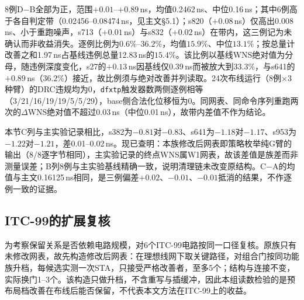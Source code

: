 \documentclass[twocolumn,10pt,fontset=windows]{ctexart}
\begin{document}
8例D$-$B全部为正，范围$+0.01$--$+0.89$\,ns，均值0.2462\,ns、中位0.16\,ns；其中6例高于各自判定带（0.02456--0.08474\,ns，见主文\S5.1）；s820（$+0.08$\,ns）仅高出0.008\,ns、小于重跑噪声，s713（$+0.01$\,ns）与s832（$+0.02$\,ns）在带内，这三例记为未确认而非收益消失。逐例比例为$0.6\%$--$36.2\%$，均值$15.9\%$、中位$13.1\%$；按总量计改善之和1.97\,ns占基线违例总量12.83\,ns的$15.4\%$。该比例以基线WNS绝对值为分母，随违例深度变化，s27的$+0.13$\,ns因基线仅0.39\,ns而被放大到$33.3\%$，与s641的$+0.89$\,ns（$36.2\%$）接近，故比例须与绝对改善并列读取。24次布线运行（8例$\times$3种臂）的DRC违规均为0，\texttt{dfxtp}触发器数两侧逐例相等（3/21/16/19/19/5/5/29），base侧合法化位移恒为0。同网表、同命令序列重跑两次的$\Delta$WNS绝对值不超过0.03\,ns（中位0.01\,ns），故带内差值不作为结论。

本节C列与主实验记录相比，s382为$-0.81$对$-0.83$、s641为$-1.18$对$-1.17$、s953为$-1.22$对$-1.21$，差0.01--0.02\,ns。现已查明：本族修改后网表即策略枚举纯G臂的输出（8/8逐字节相同），主实验记录的终点WNS属W1网表，故该差值是族差而非测量误差；B列8例与主实验基线精确一致，说明清理链未改变原结构。C$-$A的均值与主文0.16125\,ns相同，是三例偏差$+0.02$、$-0.01$、$-0.01$抵消的结果，不作逐例一致的证据。

\subsection{ITC-99的扩展复核}\label{sec:itc_four}

为考察保留关系是否依赖电路规模，对6个ITC-99电路按同一口径复核。原族只有未修改网表，故先构造修改后网表：在理想线网下取关键路径，对组合门按同功能族升档，每候选实测一次STA，只接受严格改善者，至多5个；结构与连接不变，实际换门1--3个。该构造只做升档，不含重写与插缓冲，因此本组读数检验的是预布局档改善在布线后能否保留，不代表本文方法在ITC-99上的收益。
\end{document}

